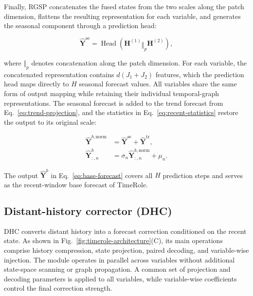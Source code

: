 Finally, RGSP concatenates the fused states from the two scales along the patch dimension, flattens the resulting representation for each variable, and generates the seasonal component through a prediction head:

\begin{equation}
\widehat{\mathbf{Y}}^{\mathrm{se}}
=\operatorname{Head}
\!\left(\mathbf{H}^{(1)}\mathbin{\Vert}_{p}\mathbf{H}^{(2)}\right),
\label{eq:seasonal-head}
\end{equation}

where \(\Vert_p\) denotes concatenation along the patch dimension. For each variable, the concatenated representation contains \(d(J_1+J_2)\) features, which the prediction head maps directly to \(H\) seasonal forecast values. All variables share the same form of output mapping while retaining their individual temporal-graph representations. The seasonal forecast is added to the trend forecast from Eq.~\eqref{eq:trend-projection}, and the statistics in Eq.~\eqref{eq:recent-statistics} restore the output to its original scale:

\begin{equation}
\begin{aligned}
\widehat{\mathbf{Y}}^{b,\mathrm{norm}}
&=\widehat{\mathbf{Y}}^{\mathrm{se}}
+\widehat{\mathbf{Y}}^{\mathrm{tr}},
\\
\widehat{\mathbf{Y}}^{b}_{:,n}
&=\sigma_n\widehat{\mathbf{Y}}^{b,\mathrm{norm}}_{:,n}+\mu_n.
\end{aligned}
\label{eq:base-forecast}
\end{equation}

The output \(\widehat{\mathbf{Y}}^{b}\) in Eq.~\eqref{eq:base-forecast} covers all \(H\) prediction steps and serves as the recent-window base forecast of TimeRole.

\subsection{Distant-history corrector (DHC)}

DHC converts distant history into a forecast correction conditioned on the recent state. As shown in Fig.~\ref{fig:timerole-architecture}(C), its main operations comprise history compression, state projection, paired decoding, and variable-wise injection. The module operates in parallel across variables without additional state-space scanning or graph propagation. A common set of projection and decoding parameters is applied to all variables, while variable-wise coefficients control the final correction strength.


